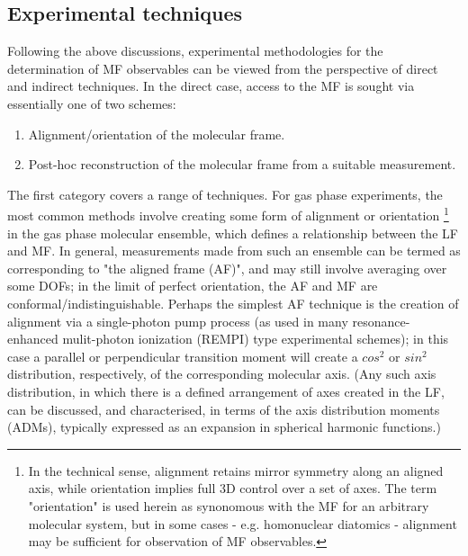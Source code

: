 \subsection{Experimental techniques}

Following the above discussions, experimental methodologies for the determination of MF observables can be viewed from the perspective of direct and indirect techniques. In the direct case, access to the MF is sought via essentially one of two schemes:

\begin{enumerate}
\item Alignment/orientation of the molecular frame.
\item Post-hoc reconstruction of the molecular frame from a suitable measurement.
\end{enumerate}

The first category covers a range of techniques. For gas phase experiments, the most common methods involve creating some form of alignment or orientation \footnote{In the technical sense, alignment retains mirror symmetry along an aligned axis, while orientation implies full 3D control over a set of axes. The term "orientation" is used herein as synonomous with the MF for an arbitrary molecular system, but in some cases - e.g. homonuclear diatomics - alignment may be sufficient for observation of MF observables.} in the gas phase molecular ensemble, which defines a relationship between the LF and MF. In general, measurements made from such an ensemble can be termed as corresponding to "the aligned frame (AF)", and may still involve averaging over some DOFs; in the limit of perfect orientation, the AF and MF are conformal/indistinguishable. Perhaps the simplest AF technique is the creation of alignment via a single-photon pump process (as used in many resonance-enhanced mulit-photon ionization (REMPI) type experimental schemes); in this case a parallel or perpendicular transition moment will create a $cos^2$ or $sin^2$ distribution, respectively, of the corresponding molecular axis. (Any such axis distribution, in which there is a defined arrangement of axes created in the LF, can be discussed, and characterised, in terms of the axis distribution moments (ADMs), typically expressed as an expansion in spherical harmonic functions.)

